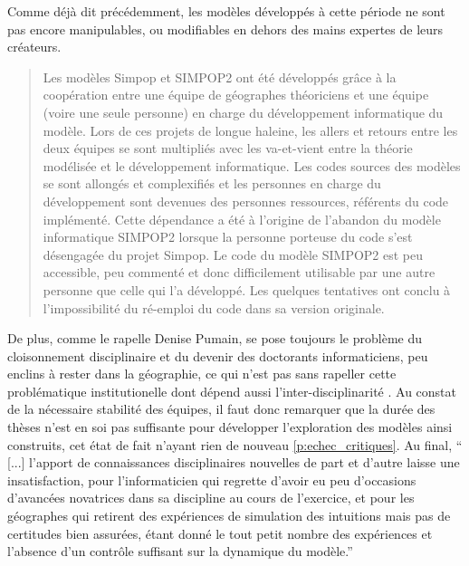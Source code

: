 Comme déjà dit précédemment, les modèles développés à cette période ne sont pas encore manipulables, ou modifiables en dehors des mains expertes de leurs créateurs.

\blockquote[{\cite[112]{Schmitt2014}}]{Les modèles Simpop et SIMPOP2 ont été développés grâce à la coopération entre une équipe de géographes théoriciens et une équipe (voire une seule personne) en charge du développement informatique du modèle. Lors de ces projets de longue haleine, les allers et retours entre les deux équipes se sont multipliés avec les va-et-vient entre la théorie modélisée et le développement informatique. Les codes sources des modèles se sont allongés et complexifiés et les personnes en charge du développement sont devenues des personnes ressources, référents du code implémenté. Cette dépendance a été à l’origine de l’abandon du modèle informatique SIMPOP2 lorsque la personne porteuse du code s’est désengagée du projet Simpop. Le code du modèle SIMPOP2 est peu accessible, peu commenté et donc difficilement utilisable par une autre personne que celle qui l’a développé. Les quelques tentatives ont conclu à l’impossibilité du ré-emploi du code dans sa version originale.}

De plus, comme le rapelle Denise Pumain, se pose toujours le problème du cloisonnement disciplinaire et du devenir des doctorants informaticiens, peu enclins à rester dans la géographie, ce qui n'est pas sans rapeller cette problématique institutionelle dont dépend aussi l'inter-disciplinarité \autocite{Chapron2014}. Au constat de la nécessaire stabilité des équipes, il faut donc remarquer que la durée des thèses n'est en soi pas suffisante pour développer l'exploration des modèles ainsi construits, cet état de fait n'ayant rien de nouveau \ref{p:echec_critiques}. Au final, \enquote{ [...] l’apport de connaissances disciplinaires nouvelles de part et d’autre laisse une insatisfaction, pour l’informaticien qui regrette d’avoir eu peu d’occasions d’avancées novatrices dans sa discipline au cours de l’exercice, et pour les géographes qui retirent des expériences de simulation des intuitions mais pas de certitudes bien assurées, étant donné le tout petit nombre des expériences et l’absence d’un contrôle suffisant sur la dynamique du modèle.} \autocite{Pumain2014}

